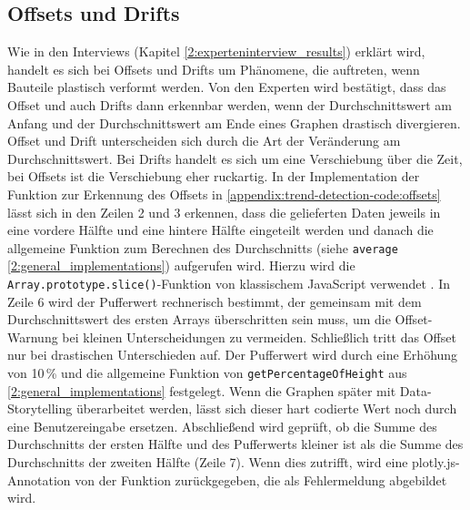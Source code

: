 \subsection{Offsets und Drifts}
Wie in den Interviews (Kapitel \ref{2:experteninterview_results}) erklärt wird, handelt es sich bei Offsets und Drifts um Phänomene, die auftreten, wenn Bauteile plastisch verformt werden. Von den Experten wird bestätigt, dass das Offset und auch Drifts dann erkennbar werden, wenn der Durchschnittswert am Anfang und der Durchschnittswert am Ende eines Graphen drastisch divergieren. Offset und Drift unterscheiden sich durch die Art der Veränderung am Durchschnittswert. Bei Drifts handelt es sich um eine Verschiebung über die Zeit, bei Offsets ist die Verschiebung eher ruckartig. In der Implementation der Funktion zur Erkennung des Offsets in \ref{appendix:trend-detection-code:offsets} lässt sich in den Zeilen 2 und 3 erkennen, dass die gelieferten Daten jeweils in eine vordere Hälfte und eine hintere Hälfte eingeteilt werden und danach die allgemeine Funktion zum Berechnen des Durchschnitts (siehe \texttt{average} \ref{2:general_implementations}) aufgerufen wird. Hierzu wird die \texttt{Array.prototype.slice()}-Funktion von klassischem JavaScript verwendet \cite{MDNcontributors.2020}. In Zeile 6 wird der Pufferwert rechnerisch bestimmt, der gemeinsam mit dem Durchschnittswert des ersten Arrays überschritten  sein muss, um die Offset-Warnung bei kleinen Unterscheidungen zu vermeiden. Schließlich tritt das Offset nur bei drastischen Unterschieden auf. Der Pufferwert wird durch eine Erhöhung von 10\,\% und die allgemeine Funktion von \texttt{getPercentageOfHeight} aus \ref{2:general_implementations} festgelegt. Wenn die Graphen später mit Data-Storytelling überarbeitet werden, lässt sich dieser hart codierte Wert noch durch eine Benutzereingabe ersetzen. Abschließend wird geprüft, ob die Summe des Durchschnitts der ersten Hälfte und des Pufferwerts kleiner ist als die Summe des Durchschnitts der zweiten Hälfte (Zeile 7). Wenn dies zutrifft, wird eine plotly.js-Annotation von der Funktion zurückgegeben, die als Fehlermeldung abgebildet wird.

